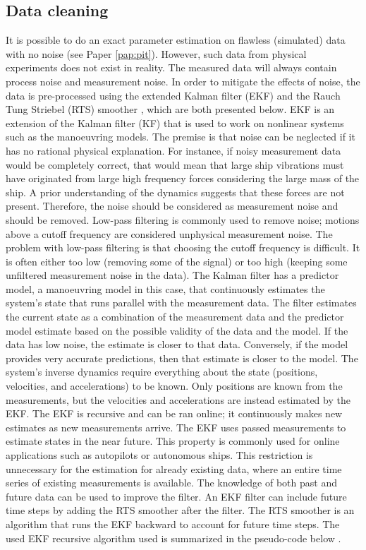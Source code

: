 \subsection{Data cleaning}
\label{sec:datacleaning}
It is possible to do an exact parameter estimation on flawless (simulated) data with no noise (see Paper \ref{pap:pit}). However, such data from physical experiments does not exist in reality. The measured data will always contain process noise and measurement noise. In order to mitigate the effects of noise, the data is pre-processed using the extended Kalman filter (EKF) \cite{brown_introduction_1997} and the Rauch Tung Striebel (RTS) smoother \cite{rauch_maximum_1965}, which are both presented below.
EKF is an extension of the Kalman filter (KF) that is used to work on nonlinear systems such as the manoeuvring models. The premise is that noise can be neglected if it has no rational physical explanation. For instance, if noisy measurement data would be  completely correct, that would mean that large ship vibrations must have originated from large high frequency forces considering the large mass of the ship. A prior understanding of the dynamics suggests that these forces are not present. Therefore, the noise should be considered as measurement noise and should be removed. Low-pass filtering is commonly used to remove noise; motions above a cutoff frequency are considered unphysical measurement noise. The problem with low-pass filtering is that choosing the cutoff frequency is difficult. It is often  either too low (removing some of the signal) or too high (keeping some unfiltered measurement noise in the data). The Kalman filter has a predictor model, a manoeuvring model in this case, that continuously estimates the system’s state that runs parallel with the measurement data. The filter estimates the current state as a combination of the measurement data and the predictor model estimate based on the possible validity of the data and the model. If the data has low noise, the estimate is closer to that data. Conversely, if the model provides very accurate predictions, then that estimate is closer to the model.
The system’s inverse dynamics require everything about the state (positions, velocities, and accelerations) to be known. Only positions are known from the measurements, but the velocities and accelerations are instead estimated by the EKF.
The EKF is recursive and can be ran online; it continuously makes new estimates as new measurements arrive. The EKF uses passed measurements to estimate states in the near future. This property is commonly used for online applications such as autopilots or autonomous ships. This restriction is unnecessary for the estimation for already existing data, where an entire time series of existing measurements is available. The knowledge of both past and future data can be used to improve the filter. An EKF filter can include future time steps by adding the RTS smoother after the filter. The RTS smoother is an algorithm that runs the EKF backward to account for future time steps. The used EKF recursive algorithm used is summarized in the pseudo-code below \cite{brown_introduction_1997}.
